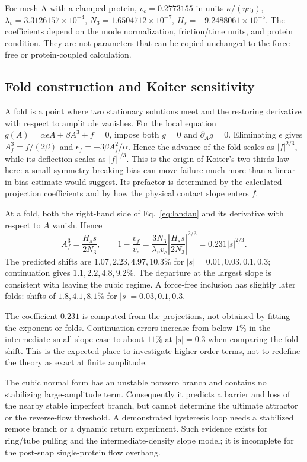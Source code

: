 For mesh A with a clamped protein, $v_c=0.2773155$ in units $\kappa/(\eta r_0)$, $\lambda_v=3.3126157\times10^{-4}$, $N_3=1.6504712\times10^{-7}$, $H_s=-9.2488061\times10^{-5}$. The coefficients depend on the mode normalization, friction/time units, and protein condition. They are not parameters that can be copied unchanged to the force-free or protein-coupled calculation.


\subsection{Fold construction and Koiter sensitivity}


A fold is a point where two stationary solutions meet and the restoring derivative with respect to amplitude vanishes. For the local equation $g(A)=\alpha\epsilon A+\beta A^3+f=0$, impose both $g=0$ and $\partial_Ag=0$. Eliminating $\epsilon$ gives $A_f^3=f/(2\beta)$ and $\epsilon_f=-3\beta A_f^2/\alpha$. Hence the advance of the fold scales as $|f|^{2/3}$, while its deflection scales as $|f|^{1/3}$. This is the origin of Koiter's two-thirds law here: a small symmetry-breaking bias can move failure much more than a linear-in-bias estimate would suggest. Its prefactor is determined by the calculated projection coefficients and by how the physical contact slope enters $f$.


At a fold, both the right-hand side of Eq.~\eqref{eq:landau} and its derivative with respect to $A$ vanish. Hence
\begin{equation}
A_f^3=\frac{H_s s}{2N_3},\qquad
1-\frac{v_f}{v_c}=\frac{3N_3}{\lambda_vv_c}\left|\frac{H_s s}{2N_3}\right|^{2/3}
=0.231|s|^{2/3}.\label{eq:koiter}
\end{equation}
The predicted shifts are $1.07,2.23,4.97,10.3\%$ for $|s|=0.01,0.03,0.1,0.3$; continuation gives $1.1,2.2,4.8,9.2\%$. The departure at the largest slope is consistent with leaving the cubic regime. A force-free inclusion has slightly later folds: shifts of $1.8,4.1,8.1\%$ for $|s|=0.03,0.1,0.3$.


The coefficient $0.231$ is computed from the projections, not obtained by fitting the exponent or folds. Continuation errors increase from below $1\%$ in the intermediate small-slope case to about $11\%$ at $|s|=0.3$ when comparing the fold shift. This is the expected place to investigate higher-order terms, not to redefine the theory as exact at finite amplitude.

The cubic normal form has an unstable nonzero branch and contains no stabilizing large-amplitude term. Consequently it predicts a barrier and loss of the nearby stable imperfect branch, but cannot determine the ultimate attractor or the reverse-flow threshold. A demonstrated hysteresis loop needs a stabilized remote branch or a dynamic return experiment. Such evidence exists for ring/tube pulling and the intermediate-density slope model; it is incomplete for the post-snap single-protein flow overhang.


